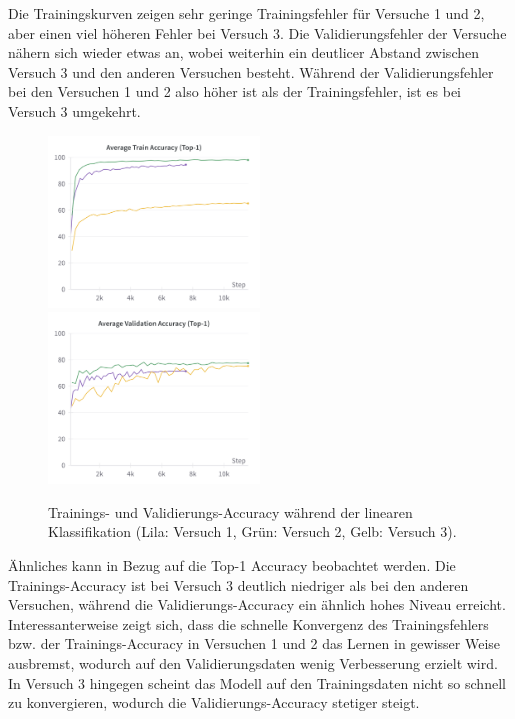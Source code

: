Die Trainingskurven zeigen sehr geringe Trainingsfehler für Versuche 1 und 2, aber einen viel höheren Fehler bei Versuch 3. Die Validierungsfehler der Versuche nähern sich wieder etwas an, wobei weiterhin ein deutlicer Abstand zwischen Versuch 3 und den anderen Versuchen besteht. Während der Validierungsfehler bei den Versuchen 1 und 2 also höher ist als der Trainingsfehler, ist es bei Versuch 3 umgekehrt.

\begin{figure}[h]
	\centering
	\includegraphics[width=0.5\textwidth]{figure_results_supcon-lin_avg-train-acc.png}%
	\includegraphics[width=0.5\textwidth]{figure_results_supcon-lin_avg-val-acc.png}
	\caption[Trainings- und Validierungs-Accuracy während der linearen Klassifikation.]{Trainings- und Validierungs-Accuracy während der linearen Klassifikation (\textcolor{exp1}{Lila}: Versuch 1, \textcolor{exp2}{Grün}: Versuch 2, \textcolor{exp3}{Gelb}: Versuch 3).}
	\label{fig:supcon-lin-acc}
\end{figure}

Ähnliches kann in Bezug auf die Top-1 Accuracy beobachtet werden. Die Trainings-Accuracy ist bei Versuch 3 deutlich niedriger als bei den anderen Versuchen, während die Validierungs-Accuracy ein ähnlich hohes Niveau erreicht. Interessanterweise zeigt sich, dass die schnelle Konvergenz des Trainingsfehlers bzw. der Trainings-Accuracy in Versuchen 1 und 2 das Lernen in gewisser Weise ausbremst, wodurch auf den Validierungsdaten wenig Verbesserung erzielt wird. In Versuch 3 hingegen scheint das Modell auf den Trainingsdaten nicht so schnell zu konvergieren, wodurch die Validierungs-Accuracy stetiger steigt.

